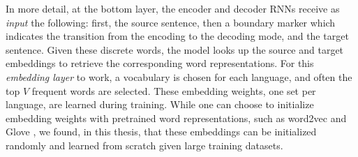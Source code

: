 In more detail, at the bottom layer, the encoder and decoder RNNs receive as
{\it input} the following: first,
the source sentence, then a boundary marker \word{\_} which indicates the
transition from the encoding to the decoding mode, and the target sentence. 
Given these discrete words, the model looks up the source and target
embeddings to retrieve the corresponding word representations.
For this {\it embedding layer} to work, a vocabulary is chosen for each language, and
often the top $V$ frequent words are selected.
These embedding weights, one set per language, are learned during training.
While one can choose to initialize embedding weights with pretrained word
representations, such as word2vec \cite{mikolov13nips} and Glove
\cite{pennington2014}, we found, in this thesis, that these
embeddings can be initialized randomly and learned from scratch given large training datasets.


